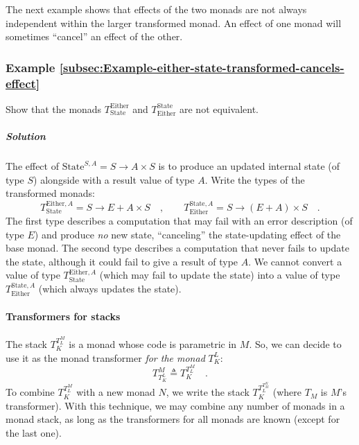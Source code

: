 The next example shows that effects of the two monads are not always
independent within the larger transformed monad. An effect of one
monad will sometimes \textsf{``}cancel\textsf{''} an effect of the other.

\subsubsection{Example \label{subsec:Example-either-state-transformed-cancels-effect}\ref{subsec:Example-either-state-transformed-cancels-effect}}

Show that the monads $T_{\text{State}}^{\text{Either}}$ and $T_{\text{Either}}^{\text{State}}$
are not equivalent.

\subparagraph{Solution}

The effect of $\text{State}^{S,A}=S\rightarrow A\times S$ is to produce
an updated internal state (of type $S$) alongside with a result value
of type $A$. Write the types of the transformed monads:
\[
T_{\text{State}}^{\text{Either},A}=S\rightarrow E+A\times S\quad,\quad\quad T_{\text{Either}}^{\text{State},A}=S\rightarrow\left(E+A\right)\times S\quad.
\]
The first type describes a computation that may fail with an error
description (of type $E$) and produce \emph{no} new state, \textsf{``}canceling\textsf{''}
the state-updating effect of the base monad. The second type describes
a computation that never fails to update the state, although it could
fail to give a result of type $A$. We cannot convert a value of type
$T_{\text{State}}^{\text{Either},A}$ (which may fail to update the
state) into a value of type $T_{\text{Either}}^{\text{State},A}$
(which always updates the state).

\paragraph{Transformers for stacks}

The stack $T_{K}^{T_{L}^{M}}$ is a monad whose code is parametric
in $M$. So, we can decide to use it as the monad transformer \emph{for
the monad} $T_{K}^{L}$:
\begin{equation}
T_{T_{K}^{L}}^{M}\triangleq T_{K}^{T_{L}^{M}}\quad.\label{eq:monad-transformers-associativity-of-combination}
\end{equation}
To combine $T_{K}^{T_{L}^{M}}$ with a new monad $N$, we write the
stack $T_{K}^{T_{L}^{T_{M}^{N}}}$ (where $T_{M}$ is $M$\textsf{'}s transformer).
With this technique, we may combine any number of monads in a monad
stack, as long as the transformers for all monads are known (except
for the last one).

